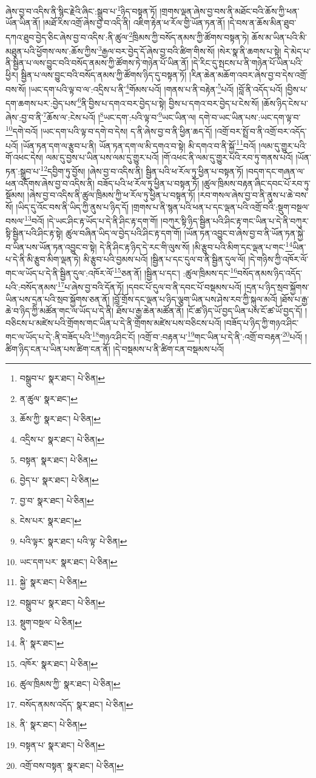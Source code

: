 ཞེས་བྱ་བ་འདིས་ནི་སྙིང་རྗེའི་ཞིང་:སྒྲུབ་པ་\footnote{བསྒྲུབ་པ་  སྣར་ཐང་།  པེ་ཅིན། }ཉིད་བསྟན་ཏོ། །གྲགས་ལྡན་ཞེས་བྱ་བས་ནི་མཐོང་བའི་ཆོས་ཀྱི་ཕན་ཡོན་ཡིན་ནོ། །མཐོ་རིས་འགྲོ་ཞེས་བྱ་བ་འདི་ནི། འཇིག་རྟེན་ཕ་རོལ་གྱི་ཡོན་ཏན་ནོ། །དེ་བས་ན་ཆོས་མིན་ཐུབ་དཀའ་ཐུབ་བྱེད་ཅིང་ཞེས་བྱ་བ་འདིས་:ནི་ཚུལ་\footnote{ན་ཚུལ་  སྣར་ཐང་། }ཁྲིམས་ཀྱི་བསོད་ནམས་ཀྱི་ཚོགས་བསྟན་ཏེ། ཆོས་མ་ཡིན་པའི་མི་མཐུན་པའི་ཕྱོགས་ལས་:ཆོས་ཀྱིས་\footnote{ཆོས་ཀྱི་  སྣར་ཐང་།  པེ་ཅིན། }རྒྱལ་བར་བྱེད་དོ་ཞེས་བྱ་བའི་ཚིག་གིས་སོ། །སེར་སྣ་ནི་ཆགས་པ་སྟེ། དེ་མེད་པ་ནི་སྦྱིན་པ་ལས་བྱུང་བའི་བསོད་ནམས་ཀྱི་ཚོགས་ཏེ་གཉེན་པོ་ཡིན་ནོ། །དེ་རིང་དུ་སྤངས་པ་ནི་གཉེན་པོ་ཡིན་པའི་ཕྱིར། སྦྱིན་པ་ལས་བྱུང་བའི་བསོད་ནམས་ཀྱི་ཚོགས་ཉིད་དུ་བསྟན་ཏོ། །རིན་ཆེན་མཆོག་འབར་ཞེས་བྱ་བ་དེས་འགྲོ་བས་སོ། །ཡང་དག་པའི་ལྟ་བ་ལ་:འདྲིས་པ་ནི་\footnote{འདྲིས་པ་  སྣར་ཐང་།  པེ་ཅིན། }གོམས་པའོ། །གནས་པ་ནི་བརྟེན་\footnote{བསྟན་  སྣར་ཐང་།  པེ་ཅིན། }པའོ། །བློ་ནི་འདོད་པའོ། །བྱིས་པ་དག་ཆགས་པར་:བྱེད་པས་\footnote{བྱེད་པ་  སྣར་ཐང་།  པེ་ཅིན། }ནི་བྱིས་པ་དགའ་བར་བྱེད་པ་སྟེ། བྱིས་པ་དགའ་བར་བྱེད་པ་ངེས་སོ། །ཆོས་ཉིད་ངེས་པ་ཞེས་:བྱ་བ་ནི་\footnote{བྱ་བ་  སྣར་ཐང་།  པེ་ཅིན། }ཆོས་ལ་:ངེས་པའོ། །\footnote{ངེས་པར་  སྣར་ཐང་། }ཡང་དག་:པའི་ལྟ་བ་\footnote{པའི་ལྟར་  སྣར་ཐང་། པའི་ལྟ་  པེ་ཅིན། }ཡང་ཡིན་ལ། དགེ་བ་ཡང་ཡིན་པས་:ཡང་དག་ལྟ་བ་\footnote{ཡང་དག་པར་  སྣར་ཐང་།  པེ་ཅིན། }དགེ་བའོ། །ཡང་དག་པའི་ལྟ་བ་དགེ་བ་དེས། ད་ནི་ཞེས་བྱ་བ་ནི་ཕྱིན་ཆད་དོ། །འགྲོ་བར་སྤྲོ་བ་ནི་འགྲོ་བར་འདོད་པའོ། །ཡོན་ཏན་དག་ལ་རྩུབ་པ་ནི། ཡོན་ཏན་དག་ལ་མི་དགའ་བ་སྟེ། མི་དགའ་བ་ནི་སྐྱོ་\footnote{སྐྱེ་  སྣར་ཐང་།  པེ་ཅིན། }བའོ། །ལམ་དུ་གྱུར་པའི་གོ་འཕང་དེས། ལམ་དུ་བྱས་པ་ཡིན་པས་ལམ་དུ་གྱུར་པའོ། །གོ་འཕང་ནི་ལམ་དུ་གྱུར་པའི་རབ་ཏུ་གནས་པའོ། །ཡོན་ཏན་:སྒྲུབ་པ་\footnote{བསྒྲུབ་པ་  སྣར་ཐང་།  པེ་ཅིན། }དབྱིག་ཏུ་བྱོས། །ཞེས་བྱ་བ་འདིས་ནི། སྦྱིན་པའི་ཕ་རོལ་ཏུ་ཕྱིན་པ་བསྟན་ཏོ། །བདག་དང་གཞན་ལ་ཕན་འདོགས་ཞེས་བྱ་བ་འདིས་ནི། བཟོད་པའི་ཕ་རོལ་ཏུ་ཕྱིན་པ་བསྟན་ཏོ། །ཚུལ་ཁྲིམས་བརྟན་ཞིང་དབང་པོ་རབ་ཏུ་སྡོམས། །ཞེས་བྱ་བ་འདིས་ནི་ཚུལ་ཁྲིམས་ཀྱི་ཕ་རོལ་ཏུ་ཕྱིན་པ་བསྟན་ཏོ། །རབ་གསལ་ཞེས་བྱ་བ་ནི་ནུས་པ་ཆེ་བས་སོ། །ཡིད་དུ་འོང་བས་ནི་ཡིད་ཀྱི་ནུས་པ་ཉིད་དོ། །གྲགས་པ་ནི་སྙན་པའི་ཕན་པ་དང་ལྡན་པའི་འགྲོ་བའི་:སྡུག་བསྔལ་བསལ་\footnote{སྡུག་བསྔལ་  པེ་ཅིན། }བའོ། །དེ་ཡང་ཤིང་རྟ་ཡོད་པ་དེ་ནི་ཤིང་རྟ་དག་གོ། །བཀུར་སྟི་ཉིད་སྦྱིན་པའི་ཤིང་རྟ་གང་ཡིན་པ་དེ་ནི་བཀུར་སྟི་སྦྱིན་པའི་ཤིང་རྟ་སྟེ། ཚུལ་བཞིན་ཡིད་ལ་བྱེད་པའི་ཤིང་རྟ་དག་གོ། །ཡོན་ཏན་འབྱུང་བ་ཞེས་བྱ་བ་ནི་ཡོན་ཏན་སྐྱེ་བ་ཡིན་པས་ཡོན་ཏན་འབྱུང་བ་སྟེ། དེ་ནི་ཤིང་རྟ་ཉིད་དེ་རང་གི་ལུས་སོ། །མི་རྩུབ་པའི་མིག་དང་ལྡན་པ་གང་\footnote{ནི་  སྣར་ཐང་། }ཡིན་པ་དེ་ནི་མི་རྩུབ་མིག་ལྡན་ཏེ། མི་རྩུབ་པའི་བྱམས་པའོ། །སྦྱིན་པ་དང་དུལ་བ་ནི་སྦྱིན་དུལ་ལོ། །དེ་གཉིས་ཀྱི་འཁོར་ལོ་གང་ལ་ཡོད་པ་དེ་ནི་སྦྱིན་དུལ་:འཁོར་ལོ་\footnote{འཁོར་  སྣར་ཐང་།  པེ་ཅིན། }ཅན་ནོ། །སྦྱིན་པ་དང་། :ཚུལ་ཁྲིམས་དང་\footnote{ཚུལ་ཁྲིམས་ཀྱི་  སྣར་ཐང་།  པེ་ཅིན། }བསོད་ནམས་ཉིད་འདོད་པའི་:བསོད་ནམས་\footnote{བསོད་ནམས་འདོད་  སྣར་ཐང་།  པེ་ཅིན། }པ་ཞེས་བྱ་བའི་དོན་ཏོ། །དབང་པོ་དུལ་བ་ནི་དབང་པོ་བསྡམས་པའོ། །དྲན་པ་ཉིད་སྲབ་སྐྱོགས་ཡིན་པས་དྲན་པའི་སྲབ་སྐྱོགས་ཅན་ནོ། །བློ་གྲོས་དང་ལྡན་པ་ཉིད་ལྕག་ཡིན་པས་ཤེས་རབ་ཀྱི་སྐུལ་མའོ། །ཐོས་པ་རྒྱ་ཆེ་བ་ཉིད་ཀྱི་མཚོན་གང་ལ་ཡོད་པ་དེ་ནི། ཐོས་པ་རྒྱ་ཆེན་མཚོན་ནོ། །ངོ་ཚ་ཉིད་ཡོ་བྱད་ཡིན་པས་ངོ་ཚ་ཡོ་བྱད་དོ། །བཅིངས་པ་མཛེས་པའི་གྲོགས་གང་ཡིན་པ་དེ་ནི་གྲོགས་མཛེས་པས་བཅིངས་པའོ། །བཟོད་པ་ཉིད་ཀྱི་གཉའ་ཤིང་གང་ལ་ཡོད་པ་དེ་:ནི་བཟོད་པའི་\footnote{ནི་  སྣར་ཐང་།  པེ་ཅིན། }གཉའ་ཤིང་ངོ། །འགྲོ་བ་:བརྟན་པ་\footnote{བསྟན་པ་  སྣར་ཐང་།  པེ་ཅིན། }གང་ཡིན་པ་དེ་ནི་:འགྲོ་བ་བརྟན་\footnote{འགྲོ་བས་བསྟན་  སྣར་ཐང་།  པེ་ཅིན། }པའོ། །ཚིག་ཉིད་ངན་པ་ཡིན་པས་ཚིག་ངན་ནོ། །དེ་བསྡམས་པ་ནི་ཚིག་ངན་བསྡམས་པའོ། 